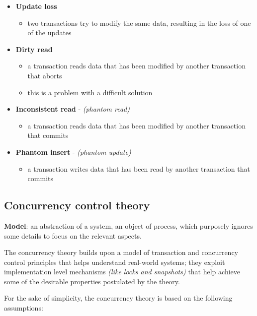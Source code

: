 \documentclass[english]{article}
\begin{document}
\begin{itemize}
  \item \textbf{Update loss}
        \begin{itemize}
          \item two transactions try to modify the same data, resulting in the loss of one of the updates
        \end{itemize}
  \item \textbf{Dirty read}
        \begin{itemize}
          \item a transaction reads data that has been modified by another transaction that aborts
          \item this is a problem with a difficult solution
        \end{itemize}
  \item \textbf{Inconsistent read} - \textit{(phantom read)}
        \begin{itemize}
          \item a transaction reads data that has been modified by another transaction that commits
        \end{itemize}
  \item \textbf{Phantom insert} - \textit{(phantom update)}
        \begin{itemize}
          \item a transaction writes data that has been read by another transaction that commits
        \end{itemize}
\end{itemize}

\subsection{Concurrency control theory}

\textbf{Model}: an abstraction of a system, an object of process, which purposely ignores some details to focus on the relevant aspects.

The concurrency theory builds upon a model of transaction and concurrency control principles that helps understand real-world systems;
they exploit implementation level mechanisms \textit{(like locks and snapshots)} that help achieve some of the desirable properties postulated by the theory.

For the sake of simplicity, the concurrency theory is based on the following assumptions:
\end{document}
